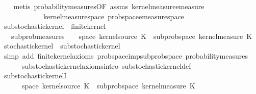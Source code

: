 \begin{isabellebody}
%
\isadelimproof
\ \ %
\endisadelimproof
%
\isatagproof
{}\isamarkupfalse%
\ {\isacharparenleft}{\kern0pt}metis\ probability{\isacharunderscore}{\kern0pt}measures{\isacharbrackleft}{\kern0pt}OF\ assms{\isacharbrackright}{\kern0pt}\ kernel{\isacharunderscore}{\kern0pt}measure{\isacharunderscore}{\kern0pt}emeasure\ \isanewline
\ \ \ \ \ \ \ \ \ \ \ \ kernel{\isacharunderscore}{\kern0pt}measure{\isacharunderscore}{\kern0pt}space\ prob{\isacharunderscore}{\kern0pt}space{\isachardot}{\kern0pt}emeasure{\isacharunderscore}{\kern0pt}space{\isacharunderscore}{\kern0pt}{}{\isacharparenright}{\kern0pt}%
\endisatagproof
{\isafoldproof}%
%
\isadelimproof
\isanewline
%
\endisadelimproof
\isanewline
{}\isamarkupfalse%
\ substochastic{\isacharunderscore}{\kern0pt}kernel\ {\isacharequal}{\kern0pt}\ finite{\isacharunderscore}{\kern0pt}kernel\ {\isacharplus}{\kern0pt}\isanewline
\ \ \ subprob{\isacharunderscore}{\kern0pt}measures{\isacharcolon}{\kern0pt}\ {\isachardoublequoteopen}{\isasymAnd}{\isasymomega}{\isachardot}{\kern0pt}\ {\isasymomega}\ {\isasymin}\ space\ {\isacharparenleft}{\kern0pt}kernel{\isacharunderscore}{\kern0pt}source\ K{\isacharparenright}{\kern0pt}\ {\isasymLongrightarrow}\ subprob{\isacharunderscore}{\kern0pt}space\ {\isacharparenleft}{\kern0pt}kernel{\isacharunderscore}{\kern0pt}measure\ K\ {\isasymomega}{\isacharparenright}{\kern0pt}{\isachardoublequoteclose}\isanewline
\isanewline
{}\isamarkupfalse%
\ stochastic{\isacharunderscore}{\kern0pt}kernel\ {\isasymsubseteq}\ substochastic{\isacharunderscore}{\kern0pt}kernel\isanewline
%
\isadelimproof
\ \ %
\endisadelimproof
%
\isatagproof
{}\isamarkupfalse%
\ {\isacharparenleft}{\kern0pt}simp\ add{\isacharcolon}{\kern0pt}\ finite{\isacharunderscore}{\kern0pt}kernel{\isacharunderscore}{\kern0pt}axioms\ prob{\isacharunderscore}{\kern0pt}space{\isacharunderscore}{\kern0pt}imp{\isacharunderscore}{\kern0pt}subprob{\isacharunderscore}{\kern0pt}space\ probability{\isacharunderscore}{\kern0pt}measures\isanewline
\ \ \ \ \ \ substochastic{\isacharunderscore}{\kern0pt}kernel{\isacharunderscore}{\kern0pt}axioms{\isachardot}{\kern0pt}intro\ substochastic{\isacharunderscore}{\kern0pt}kernel{\isacharunderscore}{\kern0pt}def{\isacharparenright}{\kern0pt}%
\endisatagproof
{\isafoldproof}%
%
\isadelimproof
\isanewline
%
\endisadelimproof
\isanewline
{}\isamarkupfalse%
\ substochastic{\isacharunderscore}{\kern0pt}kernelI{\isacharcolon}{\kern0pt}\isanewline
\ \ \ {\isachardoublequoteopen}{\isasymAnd}{\isasymomega}{\isachardot}{\kern0pt}\ {\isasymomega}\ {\isasymin}\ space\ {\isacharparenleft}{\kern0pt}kernel{\isacharunderscore}{\kern0pt}source\ K{\isacharparenright}{\kern0pt}\ {\isasymLongrightarrow}\ subprob{\isacharunderscore}{\kern0pt}space\ {\isacharparenleft}{\kern0pt}kernel{\isacharunderscore}{\kern0pt}measure\ K\ {\isasymomega}{\isacharparenright}{\kern0pt}{\isachardoublequoteclose}\isanewline

\end{isabellebody}
